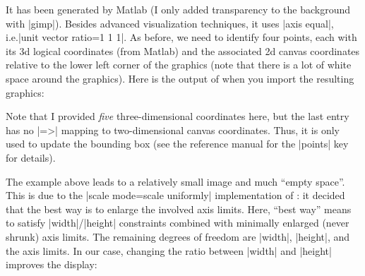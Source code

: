 {{It has been generated by Matlab (I only added transparency to the background
with |gimp|). Besides advanced visualization techniques, it uses |axis equal|,
i.e.\@ |unit vector ratio=1 1 1|. As before, we need to identify four points,
each with its 3d logical coordinates (from Matlab) and the associated 2d canvas
coordinates relative to the lower left corner of the graphics (note that there
is a lot of white space around the graphics). Here is the output of \PGFPlots{}
when you import the resulting graphics:
%
\begin{codeexample}[]
\end{codeexample}
%
\noindent Note that I provided \emph{five} three-dimensional coordinates here,
but the last entry has no |=>| mapping to two-dimensional canvas coordinates.
Thus, it is only used to update the bounding box (see the reference manual for
the |points| key for details).

The example above leads to a relatively small image and much ``empty space''.
This is due to the |scale mode=scale uniformly| implementation of \PGFPlots{}:
it decided that the best way is to enlarge the involved axis limits. Here,
``best way'' means to satisfy |width|/|height| constraints combined with
minimally enlarged (never shrunk) axis limits. The remaining degrees of
freedom are |width|, |height|, and the axis limits. In our case, changing the
ratio between |width| and |height| improves the display:

}}
